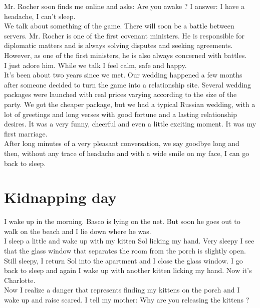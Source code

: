 \documentclass[11pt]{book}
\begin{document}
\noindent Mr. Rocher soon finds me online and asks: Are you awake ? I answer: I have a headache, I can't sleep. \\

\noindent We talk about something of the game. There will soon be a battle between servers. Mr. Rocher is one of the first covenant ministers. He is responsible for diplomatic matters and is always solving disputes and seeking agreements. However, as one of the first ministers, he is also always concerned with battles. \\

\noindent I just adore him. While we talk I feel calm, safe and happy. \\

\noindent It's been about two years since we met. Our wedding happened a few months after someone decided to turn the game into a relationship site. Several wedding packages were launched with real prices varying according to the size of the party. We got the cheaper package, but we had a typical Russian wedding, with a lot of greetings and long verses with good fortune and a lasting relationship desires. It was a very funny, cheerful and even a little exciting moment. It was my first marriage. \\

\noindent After long minutes of a very pleasant conversation, we say goodbye long and then, without any trace of headache and with a wide smile on my face, I can go back to sleep.

\chapter{Kidnapping day}

\noindent I wake up in the morning. Basco is lying on the net. But soon he goes out to walk on the beach and I lie down where he was. \\

\noindent I sleep a little and wake up with my kitten Sol licking my hand. Very sleepy I see that the glass window that separates the room from the porch is slightly open. Still sleepy, I return Sol into the apartment and I close the glass window. I go back to sleep and again I wake up with another kitten licking my hand. Now it's Charlotte. \\

\noindent Now I realize a danger that represents finding my kittens on the porch and I wake up and raise scared. I tell my mother: Why are you releasing the kittens ? \\
\end{document}
